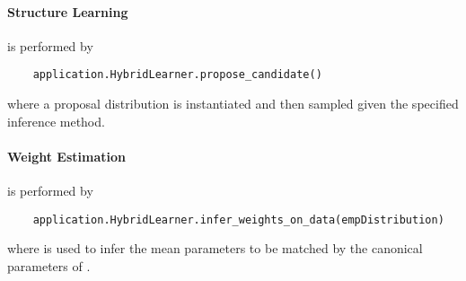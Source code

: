 \paragraph{Structure Learning}
is performed by
\begin{lstlisting}
	application.HybridLearner.propose_candidate()
\end{lstlisting}
where a proposal distribution is instantiated and then sampled given the specified inference method.

\paragraph{Weight Estimation}
is performed by
\begin{lstlisting}
	application.HybridLearner.infer_weights_on_data(empDistribution)
\end{lstlisting}
where  is used to infer the mean parameters to be matched by the canonical parameters of .
